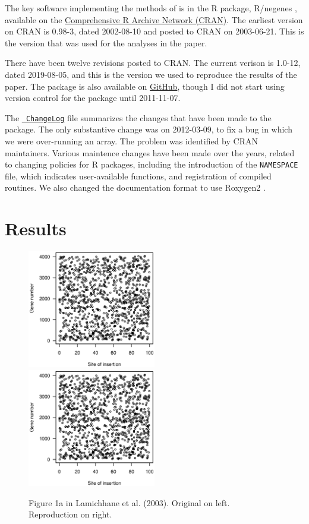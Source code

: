 The key software implementing the methods of \citet{lamichhane2003}
is in the R package, R/negenes \citep{negenes}, available on the
\href{https://cran.r-project.org/package=negenes}{Comprehensive R
Archive Network (CRAN)}. The earliest version on CRAN is 0.98-3, dated
2002-08-10 and posted to CRAN on 2003-06-21. This is the version that
was used for the analyses in the paper.

There have been twelve revisions posted to CRAN. The current verison
is 1.0-12, dated 2019-08-05, and this is the version we used to
reproduce the results of the paper. The package is also available on
\href{https://github.com/kbroman/negenes}{GitHub}, though I did not
start using version control for the package until 2011-11-07.

The \href{https://github.com/kbroman/negenes/blob/master/ChangeLog}{\tt
ChangeLog} file summarizes the changes that have been made to the
package. The only substantive change was on 2012-03-09, to fix a bug
in which we were over-running an array. The problem was identified by
CRAN maintainers. Various maintence changes have been made over the
years, related to changing policies for R packages, including the
introduction of the {\tt NAMESPACE} file, which indicates
user-available functions, and registration of compiled routines. We
also changed the documentation format to use
Roxygen2 \citep{roxygen2}.


\section{Results}


\begin{figure}
\includegraphics[viewport=133 224 464 528, width=0.50\textwidth]{../original/Nov02/R/Figs/fig1.ps}
\hfill
\includegraphics[viewport=133 224 464 528, width=0.50\textwidth]{../reproduction/Figs/fig1.ps}

\caption{Figure 1a in Lamichhane et al. (2003). Original on left. Reproduction on right.\label{fig:fig1a}}
\end{figure}

